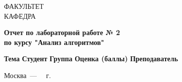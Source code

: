 \begin{titlepage}
	\noindent
	\begin{minipage}{\textwidth}
		\fontsize{12pt}{24pt}\selectfont
		ФАКУЛЬТЕТ \underline{}\\
		КАФЕДРА \underline{}
	\end{minipage}

	\vspace{2.0cm}

	\begin{center}
		\LARGE\textbf{Отчет по лабораторной работе № 2}\\
		\LARGE\textbf{по курсу "Анализ алгоритмов"}
	\end{center}

	\vspace{2.0cm}

	\noindent
	\begin{minipage}{\textwidth}
		\fontsize{12pt}{24pt}\selectfont
		\textbf{Тема} \underline{}\newline\newline
		\textbf{Студент} \underline{}\newline\newline
		\textbf{Группа} \underline{}\newline\newline
		\textbf{Оценка (баллы)} \underline{\text{~~~~~~~~~~~~~~~~~~~~~~~~~~~~~~~~~~~~~~~~~~~~~~~~~~~~~~~~~~~~~~~~~~~~~~~~~~~~~~~~~~~~~~~~~~~~~~~~~~}}\newline\newline
		\textbf{Преподаватель} \underline{}\newline
	\end{minipage}

	\begin{center}
		\vfill
		Москва~---~\the\year
		~г.
	\end{center}

	\restoregeometry
\end{titlepage}